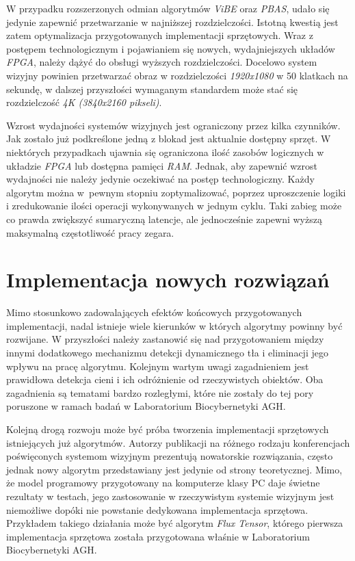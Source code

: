 W przypadku rozszerzonych odmian algorytmów \textit{ViBE} oraz \textit{PBAS}, udało się jedynie zapewnić przetwarzanie w najniższej rozdzielczości. Istotną kwestią jest zatem optymalizacja przygotowanych implementacji sprzętowych. Wraz z postępem technologicznym i pojawianiem się nowych, wydajniejszych układów \textit{FPGA}, należy dążyć do obsługi wyższych rozdzielczości. Docelowo system wizyjny powinien przetwarzać obraz w rozdzielczości \textit{1920x1080} w 50 klatkach na sekundę, w dalszej przyszłości wymaganym standardem może stać się rozdzielczość \textit{4K (3840x2160 pikseli)}.

Wzrost wydajności systemów wizyjnych jest ograniczony przez kilka czynników. Jak zostało już podkreślone jedną z blokad jest aktualnie dostępny sprzęt. W niektórych przypadkach ujawnia się ograniczona ilość zasobów logicznych w układzie \textit{FPGA} lub dostępna pamięci \textit{RAM}. Jednak, aby zapewnić wzrost wydajności nie należy jedynie oczekiwać na postęp technologiczny. Każdy algorytm można w~pewnym stopniu zoptymalizować, poprzez uproszczenie logiki i zredukowanie ilości operacji wykonywanych w jednym cyklu. Taki zabieg może co prawda zwiększyć sumaryczną latencje, ale jednocześnie zapewni wyższą maksymalną częstotliwość pracy zegara. 


\section{Implementacja nowych rozwiązań}
\label{sec:implementacja_nowych_rozwiazan}

Mimo stosunkowo zadowalających efektów końcowych przygotowanych implementacji, nadal istnieje wiele kierunków w których algorytmy powinny być rozwijane. W przyszłości należy zastanowić się nad przygotowaniem między innymi dodatkowego mechanizmu detekcji dynamicznego tła i eliminacji jego wpływu na pracę algorytmu. Kolejnym wartym uwagi zagadnieniem jest prawidłowa detekcja cieni i ich odróżnienie od rzeczywistych obiektów. Oba zagadnienia są tematami bardzo rozległymi, które nie zostały do tej pory poruszone w ramach badań w Laboratorium Biocybernetyki AGH.

Kolejną drogą rozwoju może być próba tworzenia implementacji sprzętowych istniejących już algorytmów. Autorzy publikacji na różnego rodzaju konferencjach poświęconych systemom wizyjnym prezentują nowatorskie rozwiązania, często jednak nowy algorytm przedstawiany jest jedynie od strony teoretycznej. Mimo, że model programowy przygotowany na komputerze klasy PC daje świetne rezultaty w testach, jego zastosowanie w rzeczywistym systemie wizyjnym jest niemożliwe dopóki nie powstanie dedykowana implementacja sprzętowa. Przykładem takiego działania może być algorytm \textit{Flux Tensor}, którego pierwsza implementacja sprzętowa \cite{janus_16_flux} została przygotowana właśnie w Laboratorium Biocybernetyki AGH.